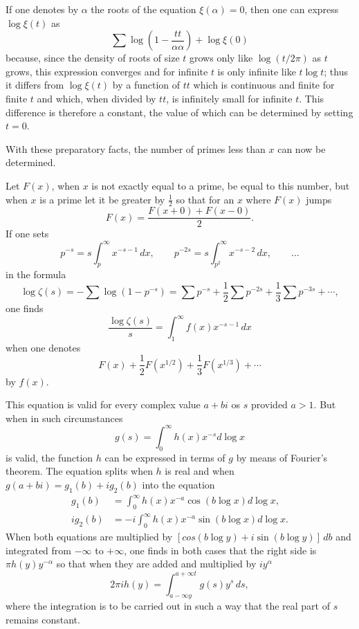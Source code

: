 If one denotes by $\alpha$ the roots of the equation $\xi(\alpha) = 0$,
then one can express $\log\xi(t)$ as
%
\[
\sum\log\left(1 - \frac{tt}{\alpha\alpha}\right) + \log\xi(0)
\]
%
because, since the density of roots of size $t$ grows only like $\log(t/2\pi)$
as $t$ grows, this expression converges and for infinite $t$ is only infinite
like $t\log t$; thus it differs from $\log\xi(t)$ by a function of $tt$ which
is continuous and finite for finite $t$ and which, when divided by $tt$, is
infinitely small for infinite $t$. This difference is therefore a constant, 
the value of which can be determined by setting $t=0$.

With these preparatory facts, the number of primes less than $x$ can now be
determined.

Let $F(x)$, when $x$ is not exactly equal to a prime, be equal to this number,
but when $x$ is a prime let it be greater by $\frac{1}{2}$ so that for an $x$
where $F(x)$ jumps
%
\[
F(x) = \frac{F(x+0) + F(x-0)}{2}.
\]
%
If one sets
%
\[
p^{-s} = s\int_p^{\infty} x^{-s-1} \, dx, 
\qquad
p^{-2s} = s\int_{p^2}^{\infty} x^{-s-2} \, dx,
\qquad
\dots
\]
%
in the formula
%
\[
\log\zeta(s) = -\sum\log(1 - p^{-s}) 
             = \sum p^{-s} + \frac{1}{2}\sum p^{-2s} + \frac{1}{3}\sum p^{-3s}
             + \cdots,
\]
%
one finds
%
\[
\frac{\log\zeta(s)}{s} = \int_1^{\infty} f(x)x^{-s-1} \, dx
\]
%
when one denotes
%
\[
F(x) + \frac{1}{2}F(x^{1/2}) + \frac{1}{3}F(x^{1/3}) + \cdots
\]
%
by $f(x)$.

This equation is valid for every complex value $a+bi$ os $s$ provided $a>1$.
But when in such circumstances
%
\[
g(s) = \int_0^{\infty} h(x)x^{-s} d\log x
\]
%
is valid, the function $h$ can be expressed in terms of $g$ by means of 
Fourier's theorem. The equation splits when $h$ is real and when 
$g(a+bi) = g_1(b) + ig_2(b)$ into the equation
%
\begin{align*}
    g_1(b) &= \int_0^{\infty} h(x)x^{-a}\cos(b\log x) d\log x, \\
    ig_2(b) &= -i\int_0^{\infty} h(x)x^{-a}\sin(b\log x) d\log x.
\end{align*}
%
When both equations are multiplied by $[cos(b\log y) + i\sin(b\log y)]\, db$
and integrated from $-\infty$ to $+\infty$, one finds in both cases that the
right side is $\pi h(y)y^{-\alpha}$ so that when they are added and multiplied
by $iy^{\alpha}$
%
\[
2\pi i h(y) = \int_{a - \infty y}^{a + \infty t} g(s) y^s \, ds,
\]
%
where the integration is to be carried out in such a way that the real part
of $s$ remains constant.

